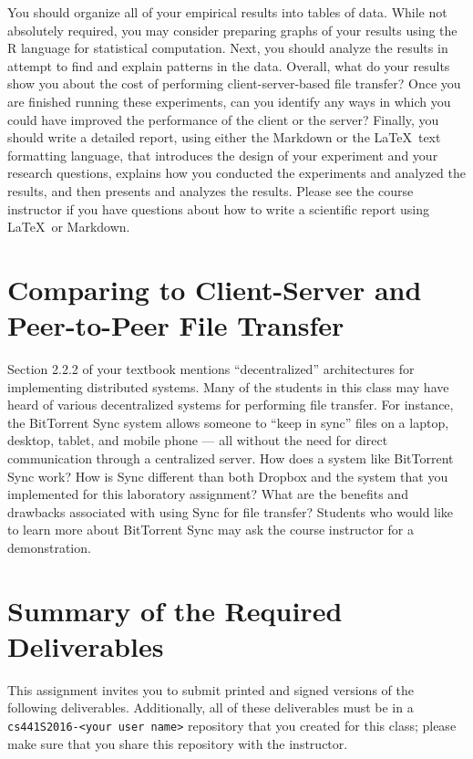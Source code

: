 You should organize all of your empirical results into tables of data. While not absolutely required, you may consider
preparing graphs of your results using the R language for statistical computation. Next, you should analyze the results
in attempt to find and explain patterns in the data. Overall, what do your results show you about the cost of performing
client-server-based file transfer? Once you are finished running these experiments, can you identify any ways in which
you could have improved the performance of the client or the server? Finally, you should write a detailed report, using
either the Markdown or the \LaTeX~text formatting language, that introduces the design of your experiment and your
research questions, explains how you conducted the experiments and analyzed the results, and then presents and analyzes
the results.  Please see the course instructor if you have questions about how to write a scientific report using
\LaTeX~or Markdown.

\section*{Comparing to Client-Server and Peer-to-Peer File Transfer}

Section 2.2.2 of your textbook mentions ``decentralized'' architectures for implementing distributed systems. Many of
the students in this class may have heard of various decentralized systems for performing file transfer. For instance,
the BitTorrent Sync system allows someone to ``keep in sync'' files on a laptop, desktop, tablet, and mobile phone ---
all without the need for direct communication through a centralized server. How does a system like BitTorrent Sync work?
How is Sync different than both Dropbox and the system that you implemented for this laboratory assignment? What are the
benefits and drawbacks associated with using Sync for file transfer? Students who would like to learn more about
BitTorrent Sync may ask the course instructor for a demonstration.

\section*{Summary of the Required Deliverables}

This assignment invites you to submit printed and signed versions of the following deliverables. Additionally,
all of these deliverables must be in a {\tt cs441S2016-<your user name>} repository that you created for this class;
please make sure that you share this repository with the instructor.

